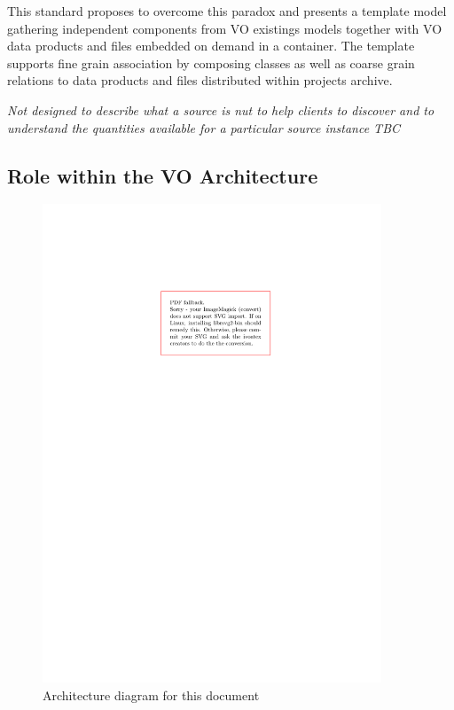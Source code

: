 \documentclass[11pt,a4paper]{ivoa}
\begin{document}
This standard proposes to overcome this paradox and presents a template model gathering independent components from VO existings models together with VO data products and files embedded on demand in a container.
The template supports fine grain association by composing classes as well as coarse grain relations to data products and files distributed within projects archive.

\emph{Not designed to describe what a source is nut to help clients to discover and to understand the quantities available for a particular source instance TBC}

\subsection{Role within the VO Architecture}

\begin{figure}
\centering


\includegraphics[width=0.9\textwidth]{role_diagram.pdf}
\caption{Architecture diagram for this document}
\label{fig:archdiag}
\end{figure}
\end{document}
